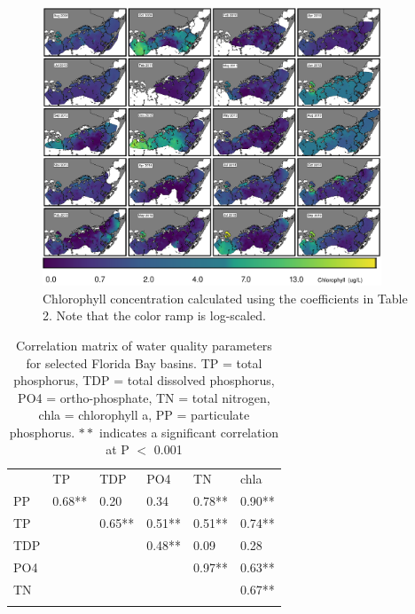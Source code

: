 \clearpage

\begin{figure}
  \centering
  \includegraphics[width=0.9\textwidth]{../../figures/multipanel.png}
  \caption{Chlorophyll concentration calculated using the coefficients in Table 2. Note that the color ramp is log-scaled.}
  \label{fig:4}
\end{figure}

\clearpage

\begin{table}
\centering
\caption{Correlation matrix of water quality parameters for selected Florida Bay basins. TP = total phosphorus, TDP = total dissolved phosphorus, PO4 = ortho-phosphate, TN = total nitrogen, chla = chlorophyll a, PP = particulate phosphorus. $**$ indicates a significant correlation at P $<$ 0.001}
\label{tab:1}       %
\begin{tabular}{llllll}
\hline\noalign{\smallskip}
& TP & TDP & PO4 & TN & chla \\
\noalign{\smallskip}\hline\noalign{\smallskip}
PP & 0.68** & 0.20 & 0.34 & 0.78** & 0.90** \\ 
TP  &  & 0.65** & 0.51** & 0.51** & 0.74** \\ 
TDP  &  &  & 0.48** & 0.09 & 0.28 \\ 
PO4  &  &  &  & 0.97** & 0.63** \\ 
TN  &  &  &  &  & 0.67** \\ 
\noalign{\smallskip}\hline
\end{tabular}
\end{table}

